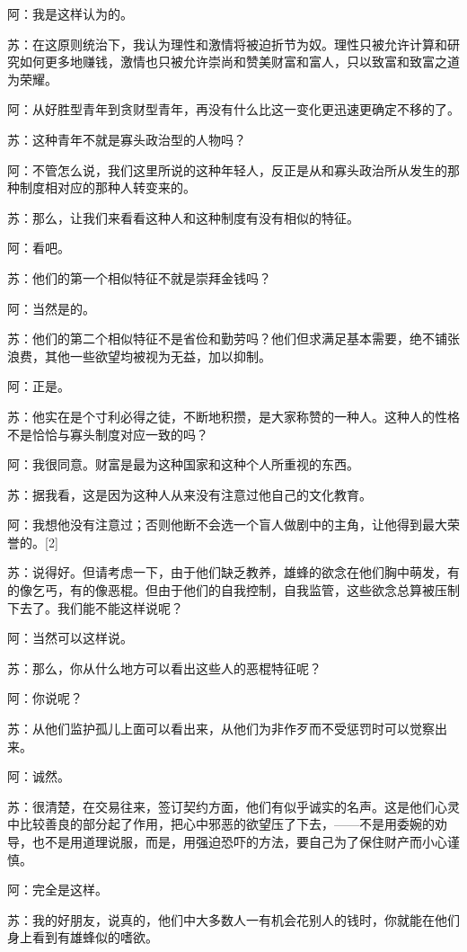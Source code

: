 \documentclass[12pt,oneside]{book}
\begin{document}
阿：我是这样认为的。

苏：在这原则统治下，我认为理性和激情将被迫折节为奴。理性只被允许计算和研究如何更多地赚钱，激情也只被允许崇尚和赞美财富和富人，只以致富和致富之道为荣耀。

阿：从好胜型青年到贪财型青年，再没有什么比这一变化更迅速更确定不移的了。

苏：这种青年不就是寡头政治型的人物吗？

阿：不管怎么说，我们这里所说的这种年轻人，反正是从和寡头政治所从发生的那种制度相对应的那种人转变来的。

苏：那么，让我们来看看这种人和这种制度有没有相似的特征。

阿：看吧。

苏：他们的第一个相似特征不就是崇拜金钱吗？

阿：当然是的。

苏：他们的第二个相似特征不是省俭和勤劳吗？他们但求满足基本需要，绝不铺张浪费，其他一些欲望均被视为无益，加以抑制。

阿：正是。

苏：他实在是个寸利必得之徒，不断地积攒，是大家称赞的一种人。这种人的性格不是恰恰与寡头制度对应一致的吗？

阿：我很同意。财富是最为这种国家和这种个人所重视的东西。

苏：据我看，这是因为这种人从来没有注意过他自己的文化教育。

阿：我想他没有注意过；否则他断不会选一个盲人做剧中的主角，让他得到最大荣誉的。[2]

苏：说得好。但请考虑一下，由于他们缺乏教养，雄蜂的欲念在他们胸中萌发，有的像乞丐，有的像恶棍。但由于他们的自我控制，自我监管，这些欲念总算被压制下去了。我们能不能这样说呢？

阿：当然可以这样说。

苏：那么，你从什么地方可以看出这些人的恶棍特征呢？

阿：你说呢？

苏：从他们监护孤儿上面可以看出来，从他们为非作歹而不受惩罚时可以觉察出来。

阿：诚然。

苏：很清楚，在交易往来，签订契约方面，他们有似乎诚实的名声。这是他们心灵中比较善良的部分起了作用，把心中邪恶的欲望压了下去，——不是用委婉的劝导，也不是用道理说服，而是，用强迫恐吓的方法，要自己为了保住财产而小心谨慎。

阿：完全是这样。

苏：我的好朋友，说真的，他们中大多数人一有机会花别人的钱时，你就能在他们身上看到有雄蜂似的嗜欲。
\end{document}
